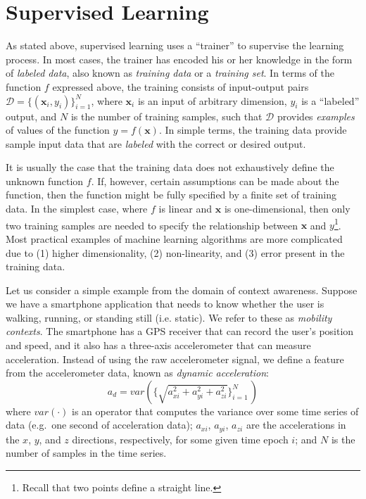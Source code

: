 \section{Supervised Learning}
\label{sec:supervised-learning}
%
As stated above, supervised learning uses a ``trainer'' to supervise the learning process. In most cases, the trainer has encoded his or her knowledge in the form of \emph{labeled data}, also known as \emph{training data} or a \emph{training set}. In terms of the function $f$ expressed above, the training consists of input-output pairs $\mathcal{D} = \{(\mathbf{x}_i, y_i)\}_{i=1}^N $, where $\mathbf{x}_i$ is an input of arbitrary dimension, $y_i$ is a ``labeled'' output, and $N$ is the number of training samples, such that $\mathcal{D}$ provides \emph{examples} of values of the function $y = f(\mathbf{x})$. In simple terms, the training data provide sample input data that are \emph{labeled} with the correct or desired output.

It is usually the case that the training data does not exhaustively define the unknown function $f$. If, however, certain assumptions can be made about the function, then the function might be fully specified by a finite set of training data. In the simplest case, where $f$ is linear and $\mathbf{x}$ is one-dimensional, then only two training samples are needed to specify the relationship between $\mathbf{x}$ and $y$\footnote{Recall that two points define a straight line.}. Most practical examples of machine learning algorithms are more complicated due to (1) higher dimensionality, (2) non-linearity, and (3) error present in the training data.

Let us consider a simple example from the domain of context awareness. Suppose we have a smartphone application that needs to know whether the user is walking, running, or standing still (i.e. static). We refer to these as \emph{mobility contexts}. The smartphone has a GPS receiver that can record the user's position and speed, and it also has a three-axis accelerometer that can measure acceleration. Instead of using the raw accelerometer signal, we define a feature from the accelerometer data, known as \emph{dynamic acceleration}:
%
\begin{equation}
a_d = var(\{\sqrt{a_{xi}^2 + a_{yi}^2 + a_{zi}^2}\}_{i=1}^N\,)
\end{equation}
%
where $var(\cdot)$ is an operator that computes the variance over some time series of data (e.g.\ one second of acceleration data); $a_{xi}$, $a_{yi}$, $a_{zi}$ are the accelerations in the $x$, $y$, and $z$ directions, respectively, for some given time epoch $i$; and $N$ is the number of samples in the time series.

